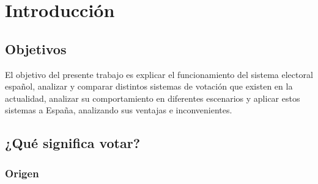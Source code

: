\documentclass[12pt,a4paper,]{book}
\def\ifdoblecara{} %
\def\ifprincipal{} %
\numberwithin{dummy}{section}
\theoremstyle{ocrenumbox}
\theoremstyle{blacknumex}
\theoremstyle{blacknumbox}
\theoremstyle{ocrenum}
\theoremstyle{ocrenum}
\begin{document}
\cleardoublepage


\ifdefined\ifdoblecara
\fancyhead[LE,RO]{\scriptsize\rightmark}
\fancyfoot[LO,RE]{\scriptsize\slshape \leftmark}
\fancyfoot[C]{}
\fancyfoot[LE,RO]{\footnotesize\thepage}
\else
\fancyhead[RO]{\scriptsize\rightmark}
\fancyfoot[LO]{\scriptsize\slshape \leftmark}
\fancyfoot[C]{}
\fancyfoot[RO]{\footnotesize\thepage}
\fi

\renewcommand{\headrulewidth}{0.4pt}
\renewcommand{\footrulewidth}{0.4pt}

\ifdefined\ifprincipal
\else
\setlength{\parindent}{1em}
\pagestyle{fancy}
\setcounter{tocdepth}{4}
\tableofcontents

\fi

\ifdefined\ifdoblecara
\fancyhead{}{}
\fancyhead[LE,RO]{\scriptsize\rightmark}
\fancyfoot[LO,RE]{\scriptsize\slshape \leftmark}
\fancyfoot[C]{}
\fancyfoot[LE,RO]{\footnotesize\thepage}
\else
\fancyhead{}{}
\fancyhead[RO]{\scriptsize\rightmark}
\fancyfoot[LO]{\scriptsize\slshape \leftmark}
\fancyfoot[C]{}
\fancyfoot[RO]{\footnotesize\thepage}
\fi
\renewcommand{\headrulewidth}{0.4pt}
\renewcommand{\footrulewidth}{0.4pt}

\hypertarget{introducciuxf3n}{%
\chapter{Introducción}\label{introducciuxf3n}}

\hypertarget{objetivos}{%
\section{Objetivos}\label{objetivos}}

El objetivo del presente trabajo es explicar el funcionamiento del
sistema electoral español, analizar y comparar distintos sistemas de
votación que existen en la actualidad, analizar su comportamiento en
diferentes escenarios y aplicar estos sistemas a España, analizando sus
ventajas e inconvenientes.

\hypertarget{quuxe9-significa-votar}{%
\section{¿Qué significa votar?}\label{quuxe9-significa-votar}}

\hypertarget{origen}{%
\subsection{Origen}\label{origen}}
\end{document}
